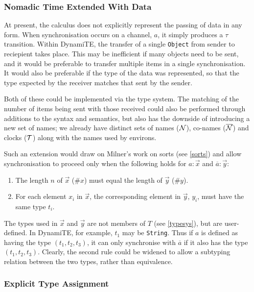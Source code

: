 \subsubsection{Nomadic Time Extended With Data}
\label{tnted}

At present, the calculus does not explicitly represent the passing of
data in any form.  When synchronisation occurs on a channel, $a$, it
simply produces a $\tau$ transition.  Within DynamiTE, the transfer of
a single \texttt{Object} from sender to reciepient takes place.  This
may be inefficient if many objects need to be sent, and it would be
preferable to transfer multiple items in a single synchronisation.  It
would also be preferable if the type of the data was represented, so
that the type expected by the receiver matches that sent by the
sender.

Both of these could be implemented via the type system.  The matching
of the number of items being sent with those received could also be
performed through additions to the syntax and semantics, but also has
the downside of introducing a new set of names; we already have
distinct sets of names ($\text{$\mathcal{N}$}$), co-names ($\text{$\overline{\text{$\mathcal{N}$}}$}$) and clocks
($\text{$\mathcal{T}$}$) along with the names used by environs.

Such an extension would draw on Milner's work on sorts (see
\ref{sorts}) and allow synchronisation to proceed only when the
following holds for $a : \vec{x}$ and $\overline{a} : \vec{y}$:

\begin{enumerate}
\item The length $n$ of $\vec{x}$ ($\#x$) must equal the length of
  $\vec{y}$ ($\#y$).
\item For each element $x_i$ in $\vec{x}$, the corresponding element
  in $\vec{y}$, $y_i$, must have the same type $t_i$.
\end{enumerate}

The types used in $\vec{x}$ and $\vec{y}$ are not members of $T$ (see
\ref{typesys}), but are user-defined.  In DynamiTE, for example, $t_1$
may be \texttt{String}.  Thus if $a$ is defined as having the type
$(t_1, t_2, t_3)$, it can only synchronise with $\overline{a}$ if it
also has the type $(t_1, t_2, t_3)$.  Clearly, the second rule could
be widened to allow a subtyping relation between the two types, rather
than equivalence.

\subsubsection{Explicit Type Assignment}

